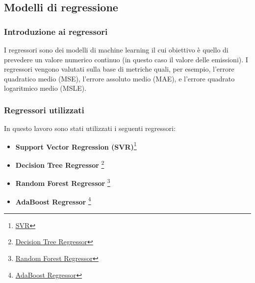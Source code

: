 \subsection{Modelli di regressione}
\subsubsection{Introduzione ai regressori}
I regressori sono dei modelli di machine learning il cui obiettivo è quello di prevedere un valore numerico continuo (in questo caso il valore delle emissioni).
I regressori vengono valutati sulla base di metriche quali, per esempio, l'errore quadratico medio (MSE), l'errore assoluto medio (MAE), e l'errore quadrato logaritmico medio (MSLE).

\subsubsection{Regressori utilizzati}
In questo lavoro sono stati utilizzati i seguenti regressori:
\begin{itemize}
    \item \textbf{Support Vector Regression (SVR)}\footnote{\href{https://scikit-learn.org/stable/modules/generated/sklearn.svm.SVR.html}{SVR}}{}
    \item \textbf{Decision Tree Regressor} \footnote{\href{https://scikit-learn.org/stable/modules/generated/sklearn.tree.DecisionTreeRegressor.html}{Decision Tree Regressor}}{}
    \item \textbf{Random Forest Regressor} \footnote{\href{https://scikit-learn.org/stable/modules/generated/sklearn.ensemble.RandomForestRegressor.html}{Random Forest Regressor}}{}
    \item \textbf{AdaBoost Regressor} \footnote{\href{https://scikit-learn.org/stable/modules/generated/sklearn.ensemble.AdaBoostRegressor.html}{AdaBoost Regressor}}{}
\end{itemize}
